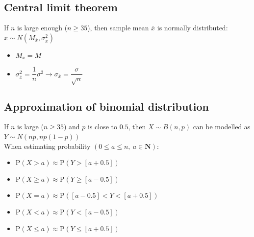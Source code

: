 \documentclass[fleqn, 11pt]{article}
\begin{document}
	
	\subsection{Central limit theorem}
	If $n$ is large enough ($n\geq35$), then sample mean $\overline{x}$ is normally distributed: $\overline{x} \sim N(M_{\overline{x}}, \sigma_{\overline{x}}^2)$
	\begin{itemize}
		\item $M_{\overline{x}}=M$
		\item $\sigma_{\overline{x}}^2=\dfrac{1}{n}\sigma^2 \rightarrow \sigma_{\overline{x}} = \dfrac{\sigma}{\sqrt{n}}$
	\end{itemize}
	
	\subsection{Approximation of binomial distribution}
	If $n$ is large ($n\geq35$) and $p$ is close to $0.5$, then $X \sim B(n,p)$ can be modelled as $Y \sim N(np, np(1-p))$\\
	When estimating probability $(0\leq a \leq n, \: a \in \textbf{N})$:
	\begin{itemize}
		\item $\text{P}(X>a)\approx \text{P}(Y>[a+0.5])$
		\item $\text{P}(X\geq a)\approx \text{P}(Y\geq [a-0.5])$
		\item $\text{P}(X=a)\approx \text{P}([a-0.5]<Y<[a+0.5])$
		\item $\text{P}(X<a)\approx \text{P}(Y<[a-0.5])$
		\item $\text{P}(X \leq a)\approx \text{P}(Y\leq [a+0.5])$
	\end{itemize}
	

	
\end{document}
